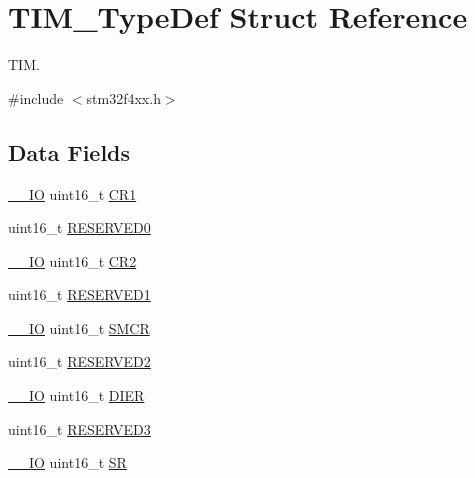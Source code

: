 \hypertarget{struct_t_i_m___type_def}{\section{T\-I\-M\-\_\-\-Type\-Def Struct Reference}
\label{struct_t_i_m___type_def}
}


T\-I\-M.  




{\ttfamily \#include $<$stm32f4xx.\-h$>$}

\subsection*{Data Fields}
\begin{DoxyCompactItemize}
\item 
\hyperlink{group___c_m_s_i_s__core__definitions_gaec43007d9998a0a0e01faede4133d6be}{\-\_\-\-\_\-\-I\-O} uint16\-\_\-t \hyperlink{struct_t_i_m___type_def_a61400ce239355b62aa25c95fcc18a5e1}{C\-R1}
\item 
uint16\-\_\-t \hyperlink{struct_t_i_m___type_def_a149feba01f9c4a49570c6d88619f504f}{R\-E\-S\-E\-R\-V\-E\-D0}
\item 
\hyperlink{group___c_m_s_i_s__core__definitions_gaec43007d9998a0a0e01faede4133d6be}{\-\_\-\-\_\-\-I\-O} uint16\-\_\-t \hyperlink{struct_t_i_m___type_def_a2a3e81bd118d1bc52d24a0b0772e6a0c}{C\-R2}
\item 
uint16\-\_\-t \hyperlink{struct_t_i_m___type_def_a8249a3955aace28d92109b391311eb30}{R\-E\-S\-E\-R\-V\-E\-D1}
\item 
\hyperlink{group___c_m_s_i_s__core__definitions_gaec43007d9998a0a0e01faede4133d6be}{\-\_\-\-\_\-\-I\-O} uint16\-\_\-t \hyperlink{struct_t_i_m___type_def_a02758713abfe580460dd5bcd8762702a}{S\-M\-C\-R}
\item 
uint16\-\_\-t \hyperlink{struct_t_i_m___type_def_a5573848497a716a9947fd87487709feb}{R\-E\-S\-E\-R\-V\-E\-D2}
\item 
\hyperlink{group___c_m_s_i_s__core__definitions_gaec43007d9998a0a0e01faede4133d6be}{\-\_\-\-\_\-\-I\-O} uint16\-\_\-t \hyperlink{struct_t_i_m___type_def_a1481b34cc41018c17e4ab592a1c8cb55}{D\-I\-E\-R}
\item 
uint16\-\_\-t \hyperlink{struct_t_i_m___type_def_a6c3b31022e6f59b800e9f5cc2a89d54c}{R\-E\-S\-E\-R\-V\-E\-D3}
\item 
\hyperlink{group___c_m_s_i_s__core__definitions_gaec43007d9998a0a0e01faede4133d6be}{\-\_\-\-\_\-\-I\-O} uint16\-\_\-t \hyperlink{struct_t_i_m___type_def_a44962ea5442d203bf4954035d1bfeb9d}{S\-R}

\end{DoxyCompactItemize}
